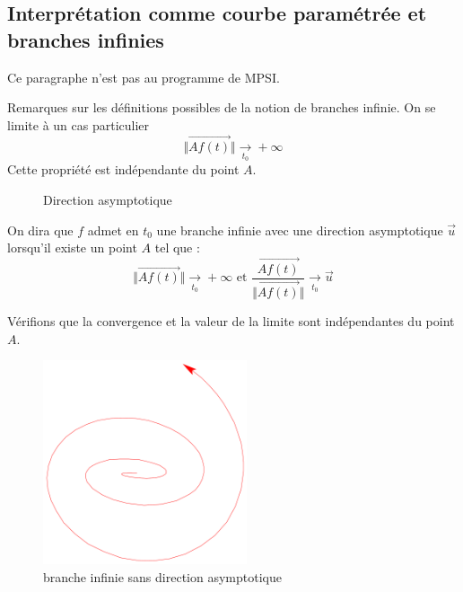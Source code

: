 \subsection{Interprétation comme courbe paramétrée et branches infinies}
Ce paragraphe n'est pas au programme de MPSI.

Remarques sur les définitions possibles de la notion de branches infinie. On se limite à un cas particulier
\begin{displaymath}
 \Vert \overrightarrow{Af(t)}\Vert \xrightarrow[t_0]{} +\infty
\end{displaymath}
Cette propriété est indépendante du point $A$.
\begin{figure}[!ht]
 \centering
 
 \caption{Direction asymptotique}
\end{figure}

\begin{defi}
 On dira que $f$ admet en $t_0$ une branche infinie avec une direction asymptotique $\overrightarrow{u}$ lorsqu'il existe un point $A$ tel que :
\begin{displaymath}
 \Vert \overrightarrow{Af(t)}\Vert \xrightarrow[t_0]{} +\infty 
\text{ et }
 \dfrac{\overrightarrow{Af(t)}}{\Vert \overrightarrow{Af(t)}\Vert} \xrightarrow[t_0]{} \overrightarrow{u}
\end{displaymath}
\end{defi}
Vérifions que la convergence et la valeur de la limite sont indépendantes du point $A$.
\begin{figure}
 \begin{center}
  \includegraphics[width=6cm]{C6430_4.pdf}
\end{center}
\caption{branche infinie sans direction asymptotique}
\end{figure}

